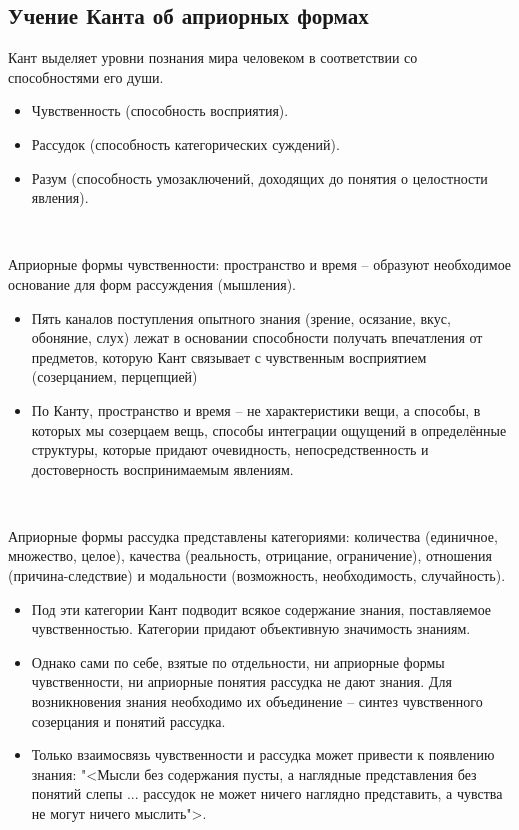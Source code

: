 \documentclass[main.tex]{subfiles}
\begin{document}
\subsection{Учение Канта об априорных формах}

{\parindent0pt
Кант выделяет уровни познания мира человеком в соответствии со способностями его души.
\begin{itemize}[nosep,leftmargin=0.5cm]
\item Чувственность (способность восприятия).
\item Рассудок (способность категорических суждений).
\item Разум (способность умозаключений, доходящих до понятия о целостности явления).
\end{itemize}
}
\ 

{\parindent0pt
Априорные формы чувственности: пространство и время -- образуют необходимое основание для форм рассуждения (мышления).
\begin{itemize}[nosep,leftmargin=0.5cm]
\item Пять каналов поступления опытного знания (зрение, осязание, вкус, обоняние, слух) лежат в основании способности получать впечатления от предметов, которую Кант связывает с чувственным восприятием (созерцанием, перцепцией)
\item По Канту, пространство и время -- не характеристики вещи, а способы, в которых мы созерцаем вещь, способы интеграции ощущений в определённые структуры, которые придают очевидность, непосредственность и достоверность воспринимаемым явлениям.
\end{itemize}
}
\ 

{\parindent0pt
Априорные формы рассудка представлены категориями: количества (единичное, множество, целое), качества (реальность, отрицание, ограничение), отношения (причина-следствие) и модальности (возможность, необходимость, случайность).
\begin{itemize}[nosep,leftmargin=0.5cm]
\item Под эти категории Кант подводит всякое содержание знания, поставляемое чувственностью.
Категории придают объективную значимость знаниям.
\item Однако сами по себе, взятые по отдельности, ни априорные формы чувственности, ни априорные понятия рассудка не дают знания.
Для возникновения знания необходимо их объединение -- синтез чувственного созерцания и понятий рассудка.
\item Только взаимосвязь чувственности и рассудка может привести к появлению знания: "<Мысли без содержания пусты, а наглядные представления без понятий слепы ... рассудок не может ничего наглядно представить, а чувства не могут ничего мыслить">.
\end{itemize}
}
\ 
\end{document}
